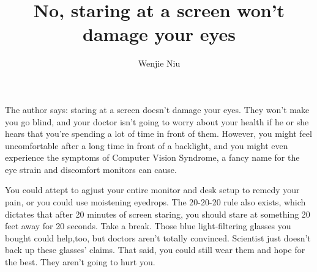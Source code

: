 \documentclass{article}
\author{Wenjie Niu}
\title{No, staring at a screen won’t damage your eyes}
\begin{document}
\maketitle
The author says: staring at a screen doesn't damage your eyes. They won't make you go blind, and your doctor isn't going to worry about your health if he or she hears that you're spending a lot of time in front of them. However, you might feel uncomfortable after a long time in front of a backlight, and you might even experience the symptoms of Computer Vision Syndrome, a fancy name for the eye strain and discomfort monitors can cause.

You could attept to agjust your entire monitor and desk setup to remedy your pain, or you could use moistening eyedrops. The 20-20-20 rule also exists, which dictates that after 20 minutes of screen staring, you should stare at something 20 feet away for 20 seconds. Take a break. Those blue light-filtering glasses you bought could help,too, but doctors aren't totally convinced. Scientist just doesn't back up these glasses' claims. That said, you could still wear them and hope for the best. They aren't going to hurt you.  
\end{document}
